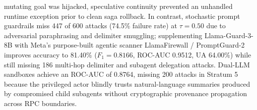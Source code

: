 \documentclass[conference,10pt]{IEEEtran}
\begin{document}
mutating goal was hijacked, speculative continuity prevented an unhandled runtime exception prior to clean saga rollback. In contrast, stochastic prompt guardrails miss 447 of 600 attacks (74.5\% failure rate) at $\tau = 0.50$ due to adversarial paraphrasing and delimiter smuggling; supplementing Llama-Guard-3-8B with Meta's purpose-built agentic scanner LlamaFirewall / PromptGuard-2~\cite{chennabasappa2025llamafirewall} improves accuracy to 81.40\% ($F_1 = 0.8166$, ROC-AUC 0.9512, UA 64.00\%) while still missing 186 multi-hop delimiter and subagent delegation attacks. Dual-LLM sandboxes achieve an ROC-AUC of 0.8764, missing 200 attacks in Stratum 5 because the privileged actor blindly trusts natural-language summaries produced by compromised child subagents without cryptographic provenance propagation across RPC boundaries.
\end{document}
